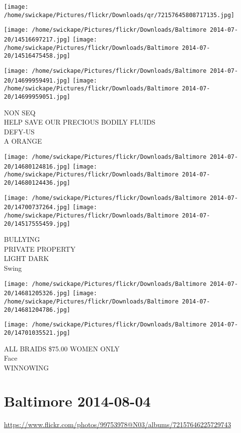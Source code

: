 \documentclass[10pt,letterpaper]{article}
\begin{document}
\texttt{[image: /home/swickape/Pictures/flickr/Downloads/qr/72157645808717135.jpg]}
\pagebreak

\texttt{[image: /home/swickape/Pictures/flickr/Downloads/Baltimore 2014-07-20/14516697217.jpg]}
\texttt{[image: /home/swickape/Pictures/flickr/Downloads/Baltimore 2014-07-20/14516475458.jpg]}

\texttt{[image: /home/swickape/Pictures/flickr/Downloads/Baltimore 2014-07-20/14699959491.jpg]}
\texttt{[image: /home/swickape/Pictures/flickr/Downloads/Baltimore 2014-07-20/14699959051.jpg]}

NON SEQ\\
HELP SAVE OUR PRECIOUS BODILY FLUIDS\\
DEFY{-}US\\
A ORANGE
\pagebreak

\texttt{[image: /home/swickape/Pictures/flickr/Downloads/Baltimore 2014-07-20/14680124816.jpg]}
\texttt{[image: /home/swickape/Pictures/flickr/Downloads/Baltimore 2014-07-20/14680124436.jpg]}

\texttt{[image: /home/swickape/Pictures/flickr/Downloads/Baltimore 2014-07-20/14700737264.jpg]}
\texttt{[image: /home/swickape/Pictures/flickr/Downloads/Baltimore 2014-07-20/14517555459.jpg]}

BULLYING\\
PRIVATE PROPERTY\\
LIGHT DARK\\
Swing
\pagebreak

\texttt{[image: /home/swickape/Pictures/flickr/Downloads/Baltimore 2014-07-20/14681205326.jpg]}
\texttt{[image: /home/swickape/Pictures/flickr/Downloads/Baltimore 2014-07-20/14681204786.jpg]}

\texttt{[image: /home/swickape/Pictures/flickr/Downloads/Baltimore 2014-07-20/14701035521.jpg]}

ALL BRAIDS \$75.00 WOMEN ONLY\\
Face\\
WINNOWING
\pagebreak

\section*{Baltimore 2014-08-04}

\url{https://www.flickr.com/photos/99753978@N03/albums/72157646225729743}
\end{document}
